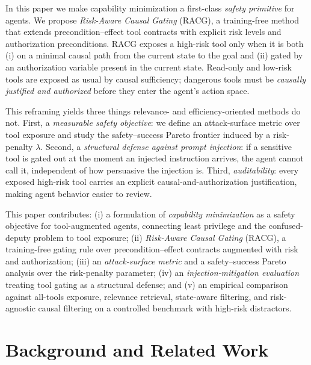 \documentclass[conference,onecolumn]{IEEEtran}
\begin{document}
In this paper we make capability minimization a first-class \emph{safety primitive} for agents. We propose \emph{Risk-Aware Causal Gating} (RACG), a training-free method that extends precondition--effect tool contracts with explicit risk levels and authorization preconditions. RACG exposes a high-risk tool only when it is both (i) on a minimal causal path from the current state to the goal and (ii) gated by an authorization variable present in the current state. Read-only and low-risk tools are exposed as usual by causal sufficiency; dangerous tools must be \emph{causally justified and authorized} before they enter the agent's action space.

This reframing yields three things relevance- and efficiency-oriented methods do not. First, a \emph{measurable safety objective}: we define an attack-surface metric over tool exposure and study the safety--success Pareto frontier induced by a risk-penalty $\lambda$. Second, a \emph{structural defense against prompt injection}: if a sensitive tool is gated out at the moment an injected instruction arrives, the agent cannot call it, independent of how persuasive the injection is. Third, \emph{auditability}: every exposed high-risk tool carries an explicit causal-and-authorization justification, making agent behavior easier to review.

This paper contributes: (i) a formulation of \emph{capability minimization} as a safety objective for tool-augmented agents, connecting least privilege and the confused-deputy problem to tool exposure; (ii) \emph{Risk-Aware Causal Gating} (RACG), a training-free gating rule over precondition--effect contracts augmented with risk and authorization; (iii) an \emph{attack-surface metric} and a safety--success Pareto analysis over the risk-penalty parameter; (iv) an \emph{injection-mitigation evaluation} treating tool gating as a structural defense; and (v) an empirical comparison against all-tools exposure, relevance retrieval, state-aware filtering, and risk-agnostic causal filtering on a controlled benchmark with high-risk distractors.

\section{Background and Related Work}
\label{sec:background}
\end{document}

